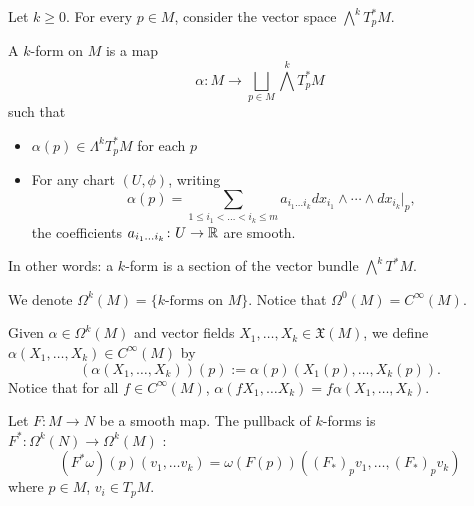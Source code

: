  

Let $k\ge 0$. For every $p\in M$, consider the vector space $\bigwedge ^{k} T_p^{*} M$.

\begin{definition}
    A $k$-form on $M$ is a map
    \[
    \alpha: M \to  \bigsqcup_{p \in  M} \bigwedge ^{k} T_p^{*} M
    \] 
    such that
    \begin{itemize}
        \item $\alpha(p) \in  \Lambda^{k} T_p^{*}M$ for each $p$
        \item For any chart $(U,\phi)$, writing
        $$\alpha(p)=
        \sum_{1 \le   i_1 <  \ldots <  i_k \le  m}a_{i_1   \ldots i_k}
        dx_{i_1} \wedge \cdots \wedge dx_{i_k}|_p,$$        
          the coefficients $a_{i_1   \ldots i_k} \colon U\to \mathbb{R}$ are smooth.
    \end{itemize}
\end{definition}
\begin{remark}
    In other words: a $k$-form is a section of the vector bundle  $\bigwedge^{k} T^{*}M$.
\end{remark}
We denote $\Omega^{k}(M) = \{\text{$k$-forms on $M$}\}$. Notice that $\Omega^0(M)=C^{\infty}(M)$.

\begin{remark}
    Given $\alpha \in \Omega^{k}(M)$ and vector fields $X_1, \ldots, X_k \in 
    \mathfrak{X}(M)$, we define $\alpha(X_1, \ldots, X_k)\in C^{\infty}(M)$ by
    \[
        (\alpha(X_1, \ldots, X_k))(p) := \alpha(p)(X_1(p), \ldots, X_k(p))
    .\] 
    Notice that for all $f \in C^{\infty}(M)$,
    $\alpha( fX_1, \ldots X_k) = f \alpha(X_1, \ldots, X_k)$.
\end{remark}
\begin{definition}
    Let $F: M \to  N$ be a smooth map.
    The pullback of $k$-forms is $F^{*}: \Omega^{k}(N) \to \Omega^{k}(M)$ :
    \[
        (F^{*} \omega)(p)(v_1, \ldots v_k) = \omega(F(p))(
        (F_*)_p v_1, 
        \ldots,
        (F_*)_p v_k)
\]
where $p\in M$, $v_i\in T_pM$. 
\end{definition}

